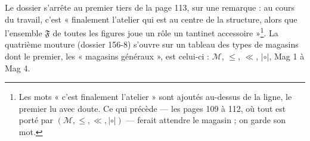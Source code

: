 \documentclass[11pt,a4paper]{article}
\begin{document}
Le dossier s'arrête au premier tiers de la page 113, sur une remarque : au cours
du travail, c'est « finalement l'atelier qui est au centre de la structure,
alors que l'ensemble $\mathfrak{F}$ de toutes les figures joue un rôle un tantinet
accessoire »\footnote{Les mots « c'est finalement l'atelier » sont ajoutés au-dessus
de la ligne, le premier lu avec doute. Ce qui précède --- les pages 109 à 112, où
tout est porté par $(\mathcal{M}, \leq, \ll, \mathrel{|{\circ}|})$ --- ferait
attendre le magasin ; on garde son mot.}. La quatrième mouture (dossier 156-8)
s'ouvre sur un tableau des types de magasins dont le premier, les « magasins
généraux », est celui-ci : $\mathcal{M}$, $\leq$, $\ll$, $\mathrel{|{\circ}|}$, Mag
1 à Mag 4.
\end{document}
